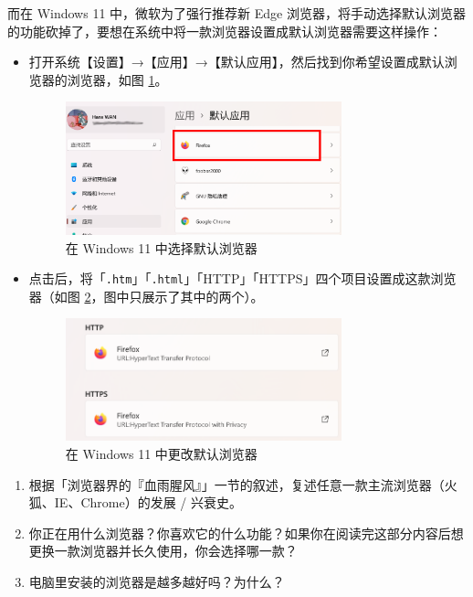 而在 Windows 11 中，微软为了强行推荐新 Edge 浏览器，将手动选择默认浏览器的功能砍掉了，要想在系统中将一款浏览器设置成默认浏览器需要这样操作：

\begin{itemize}
  \item 打开系统【设置】→【应用】→【默认应用】，然后找到你希望设置成默认浏览器的浏览器，如图 \ref{Windows_11_default_browser}。
    \begin{figure}[htb!]
      \centering
      \includegraphics[width=8cm]{assets/Windows_11_default_browser.png}
      \caption{在 Windows 11 中选择默认浏览器}
      \label{Windows_11_default_browser}
    \end{figure}
  \item 点击后，将「\verb|.htm|」「\verb|.html|」「HTTP」「HTTPS」四个项目设置成这款浏览器（如图 \ref{Win_11_Change_Browser}，图中只展示了其中的两个）。
    \begin{figure}[htb!]
      \centering
      \includegraphics[width=8cm]{assets/Win_11_Change_Browser.png}
      \caption{在 Windows 11 中更改默认浏览器}
      \label{Win_11_Change_Browser}
    \end{figure}
\end{itemize}

\practice

\begin{enumerate}
  \item 根据「浏览器界的『血雨腥风』」一节的叙述，复述任意一款主流浏览器（火狐、IE、Chrome）的发展 / 兴衰史。
  \item 你正在用什么浏览器？你喜欢它的什么功能？如果你在阅读完这部分内容后想更换一款浏览器并长久使用，你会选择哪一款？
  \item 电脑里安装的浏览器是越多越好吗？为什么？
\end{enumerate}
